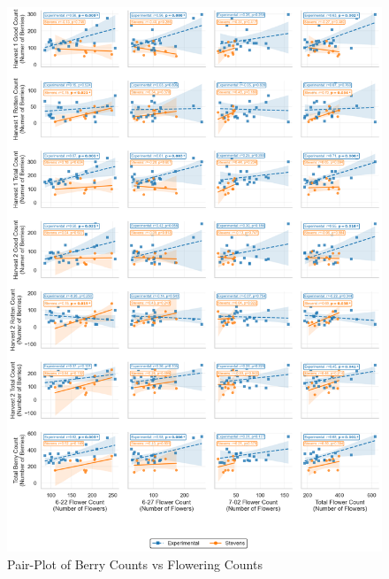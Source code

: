 

\newpage

\begin{figure}[H]
    \centering
    \includegraphics[width=1\linewidth]{images/Flower pair-plot.png}
    \caption{Pair-Plot of Berry Counts vs Flowering Counts}
    \label{fig:Flower Pair-Plot}
\end{figure}

